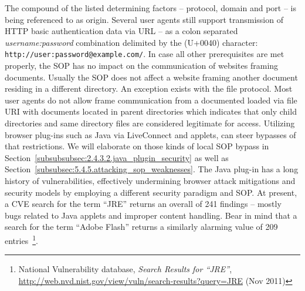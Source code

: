 	The compound of the listed determining factors -- protocol, domain and port -- is being referenced to as origin. Several user agents still support transmission of HTTP basic authentication data via URL -- as a colon separated \textit{username:password} combination delimited by the \@ (U+0040) character: \texttt{http://user:password@example.com/}. In case all other prerequisites are met properly, the SOP has no impact on the communication of websites framing documents. Usually the SOP does not affect a website framing another document residing in a different directory. An exception exists with the file protocol. Most user agents do not allow frame communication from a documented loaded via file URI with documents located in parent directories which indicates that only child directories and same directory files are considered legitimate for access. Utilizing browser plug-ins such as Java via LiveConnect and applets, can steer bypasses of that restrictions. We will elaborate on those kinds of local SOP bypass 
in Section~\ref{subsubsubsec:2.4.3.2.java_plugin_security} as well as Section~\ref{subsubsec:5.4.5.attacking_sop_weaknesses}. The Java plug-in has a long history of vulnerabilities, effectively undermining browser attack mitigations and security models by employing a different security paradigm and SOP. At present, a CVE search for the term ``JRE'' returns an overall of 241 findings -- mostly bugs related to Java applets and improper content handling. Bear in mind that a search for the term ``Adobe Flash'' returns a similarly alarming value of 209 entries~\footnote{National Vulnerability database, \textit{Search Results for ``JRE''}, \url{http://web.nvd.nist.gov/view/vuln/search-results?query=JRE} (Nov 2011) }. \\

